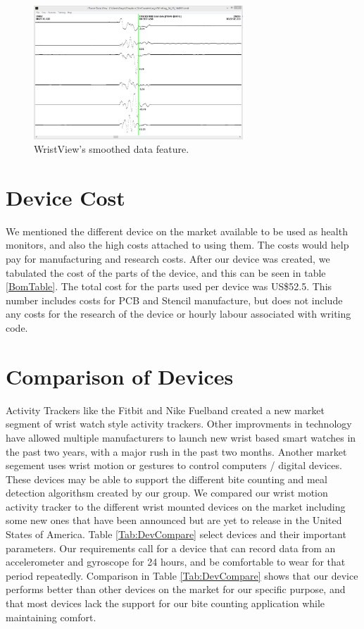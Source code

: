 \begin{figure}
\begin{center}
\includegraphics[width=0.7\textwidth]{images/WristSmooth.jpg}
\caption{WristView's smoothed data feature.}
\label{Fig:WristViewSoomth}
\end{center}
\end{figure}

\section{Device Cost}
\label{Sec:DevCost}
We mentioned the different device on the market available to be used as health monitors,
and also the high costs attached to using them.
The costs would help pay for manufacturing and research costs.
After our device was created, 
we tabulated the cost of the parts of the device, and this can be seen in table \ref{BomTable}.
The total cost for the parts used per device was US\$52.5.
This number includes costs for PCB and Stencil manufacture, but does not include any costs for the research of the device or hourly labour associated with writing code.


\section{Comparison of Devices}
\label{Sec:Comparison}
Activity Trackers like the Fitbit and Nike Fuelband created a new market segment of
wrist watch style activity trackers.
Other improvments in technology have allowed multiple manufacturers to launch new
wrist based smart watches in the past two years,
with a major rush in the past two months.
Another market segement uses wrist motion or gestures to control computers / digital devices.
These devices may be able to support the different bite counting and meal detection algorithsm created by our group.
We compared our wrist motion activity tracker to the different wrist mounted devices on the market
including some new ones that have been announced but are yet to release in the United States of America.
Table \ref{Tab:DevCompare} select devices and their important parameters.
Our requirements call for a device that can record data from an accelerometer and gyroscope for 24 hours,
and be comfortable to wear for that period repeatedly. Comparison in Table \ref{Tab:DevCompare} shows that our device performs better than other devices on the market for our specific purpose, and that most devices lack the support for our bite counting application while maintaining comfort.
